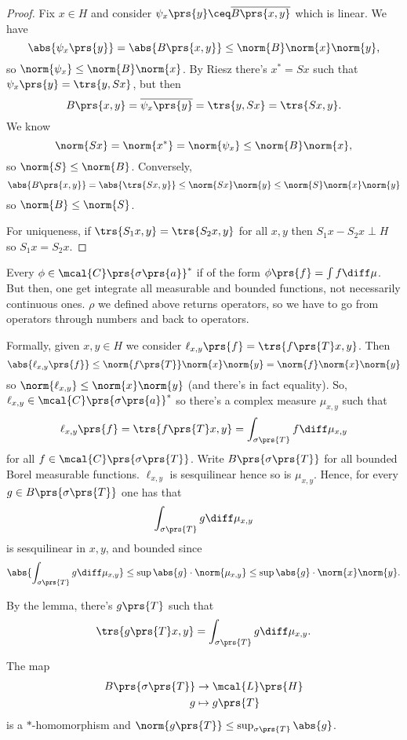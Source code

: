 \documentclass[10pt, twoside]{book}
\begin{document}
\begin{proof}
Fix $x \in H$ and consider $\psi_x\prs{y} \ceq \overline{B\prs{x,y}}$ which is linear. We have
\[\abs{\psi_x\prs{y}} = \abs{B\prs{x,y}} \leq \norm{B} \norm{x} \norm{y} \text{,}\]
so $\norm{\psi_x} \leq \norm{B} \norm{x}$.
By Riesz there's $x^* = Sx$ such that $\psi_x\prs{y} = \trs{y, Sx}$, but then
\[B\prs{x,y} = \overline{\psi_x\prs{y}} = \trs{y, Sx} = \trs{Sx, y} \text{.}\]
We know
\[\norm{Sx} = \norm{x^*} = \norm{\psi_x} \leq \norm{B} \norm{x} \text{,}\]
so $\norm{S} \leq \norm{B}$.
Conversely,
\[\abs{B\prs{x,y}} = \abs{\trs{Sx, y}} \leq \norm{S x} \norm{y} \leq \norm{S} \norm{x} \norm{y}\]
so $\norm{B} \leq \norm{S}$.

For uniqueness, if $\trs{S_1 x, y} = \trs{S_2 x, y}$ for all $x,y$ then $S_1 x - S_2 x \perp H$ so $S_1 x = S_2 x$.
\end{proof}

Every $\phi \in \mcal{C}\prs{\sigma\prs{a}}^*$ if of the form $\phi\prs{f} = \int f \diff \mu$. But then, one get integrate all measurable and bounded functions, not necessarily continuous ones. $\rho$ we defined above returns operators, so we have to go from operators through numbers and back to operators.

Formally, given $x,y \in H$ we consider $\ell_{x,y}\prs{f} = \trs{f\prs{T} x, y}$. Then
\[\abs{\ell_{x,y}\prs{f}} \leq \norm{f\prs{T}} \norm{x} \norm{y} = \norm{f}\norm{x}\norm{y}\]
so $\norm{\ell_{x,y}} \leq \norm{x} \norm{y}$ (and there's in fact equality).
So, $\ell_{x,y} \in \mcal{C}\prs{\sigma\prs{a}}^*$ so there's a complex measure $\mu_{x,y}$ such that
\[\ell_{x,y}\prs{f} = \trs{f\prs{T} x, y} = \int_{\sigma\prs{T}} f \diff \mu_{x,y}\]
for all $f \in \mcal{C}\prs{\sigma\prs{T}}$.
Write $B\prs{\sigma\prs{T}}$ for all bounded Borel measurable functions. $\ell_{x,y}$ is sesquilinear hence so is $\mu_{x,y}$. Hence, for every $g \in B\prs{\sigma\prs{T}}$ one has that
\[\int_{\sigma\prs{T}} g \diff \mu_{x,y}\]
is sesquilinear in $x,y$, and bounded since
\[\abs{\int_{\sigma\prs{T}} g \diff \mu_{x,y}} \leq \sup \abs{g} \cdot \norm{\mu_{x,y}} \leq \sup \abs{g} \cdot \norm{x} \norm{y} \text{.}\]

By the lemma, there's $g\prs{T}$ such that \[\trs{g\prs{T} x, y} = \int_{\sigma\prs{T}} g \diff \mu_{x,y} \text{.}\]

\begin{theorem}
The map
\begin{align*}
B\prs{\sigma\prs{T}} &\to \mcal{L}\prs{H} \\
g &\mapsto g\prs{T}
\end{align*}
is a $*$-homomorphism and $\norm{g\prs{T}} \leq \sup_{\sigma \prs{T}} \abs{g}$.
\end{theorem}
\end{document}
